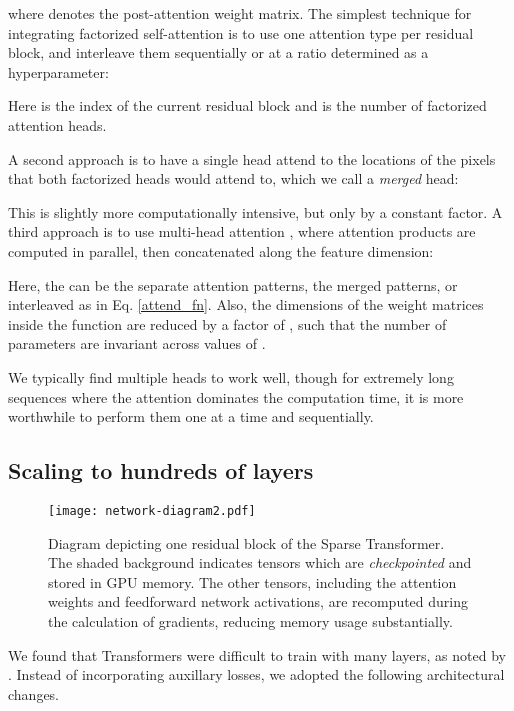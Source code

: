 \documentclass{article}
\begin{document}
where  denotes the post-attention weight matrix. The simplest technique for integrating factorized self-attention is to use one attention type per residual block, and interleave them sequentially or at a ratio determined as a hyperparameter:



Here  is the index of the current residual block and  is the number of factorized attention heads.

A second approach is to have a single head attend to the locations of the pixels that both factorized heads would attend to, which we call a \textit{merged} head:



This is slightly more computationally intensive, but only by a constant factor. A third approach is to use multi-head attention \cite{vaswani2017attention}, where  attention products are computed in parallel, then concatenated along the feature dimension:



Here, the  can be the separate attention patterns, the merged patterns, or interleaved as in Eq. \ref{attend_fn}. Also, the dimensions of the weight matrices inside the  function are reduced by a factor of , such that the number of parameters are invariant across values of .

We typically find multiple heads to work well, though for extremely long sequences where the attention dominates the computation time, it is more worthwhile to perform them one at a time and sequentially.

\subsection{Scaling to hundreds of layers}

\begin{figure}[t]
\centering
\setlength\fboxsep{0pt}
\setlength\fboxrule{0.25pt}
\texttt{[image: network-diagram2.pdf]}
\caption{Diagram depicting one residual block of the Sparse Transformer. The shaded background indicates tensors which are \textit{checkpointed} \cite{chen2016training} and stored in GPU memory. The other tensors, including the attention weights and feedforward network activations, are recomputed during the calculation of gradients, reducing memory usage substantially. }
\label{gemnetarch}
\end{figure}

We found that Transformers were difficult to train with many layers, as noted by \cite{al2018character}. Instead of incorporating auxillary losses, we adopted the following architectural changes.
\end{document}
